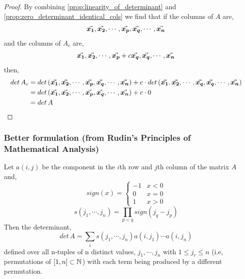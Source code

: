 \documentclass[MathsNotesBase.tex]{subfiles}
\begin{document}
{		
		\begin{proof}
			By combining \autoref{prop:linearity_of_determinant} and \autoref{prop:zero_determinant_identical_cols} we find that if the columns of $A$ are,
			\[ \vec{\bm{x_1}}, \vec{\bm{x_2}}, \cdots ,  \vec{\bm{x_p}}, \vec{\bm{x_q}}, \cdots, \vec{\bm{x_n}} \]
			and the columns of $A_c$ are,
			\[ \vec{\bm{x_1}}, \vec{\bm{x_2}}, \cdots , \vec{\bm{x_p}} + c\vec{\bm{x_q}}, \vec{\bm{x_q}}, \cdots , \vec{\bm{x_n}} \]
			then,
			\begin{align*} 
				det\,A_c &= det\,(\vec{\bm{x_1}}, \vec{\bm{x_2}}, \cdots ,  \vec{\bm{x_p}}, \vec{\bm{x_q}}, \cdots, \vec{\bm{x_n}}) + c \cdot det\,(\vec{\bm{x_1}}, \vec{\bm{x_2}}, \cdots ,  \vec{\bm{x_q}}, \vec{\bm{x_q}}, \cdots, \vec{\bm{x_n}})\\
						 &= det\,(\vec{\bm{x_1}}, \vec{\bm{x_2}}, \cdots ,  \vec{\bm{x_p}}, \vec{\bm{x_q}}, \cdots, \vec{\bm{x_n}}) + c \cdot 0\\
						 &= det\,A
			\end{align*}
		\end{proof}
	
		\subsubsection{Better formulation \tiny{(from Rudin's Principles of Mathematical Analysis)}}
		Let $a(i,j)$ be the component in the $i$th row and $j$th column of the matrix $A$ and, 
		\[ sign(x) = \begin{cases} 
						-1 & x < 0 \\
						0 & x = 0 \\
						1 & x > 0 
					 \end{cases} 
		\]
		\[ s(j_1,\cdots,j_n) = \prod_{p < q}{sign(j_q - j_p)} \]
		Then the determinant,
		\[ det\, A = \sum_{i}s(j_1,\cdots,j_n)a(i,j_1) \cdots a(i,j_n) \]
		defined over all n-tuples of n distinct values, $j_1, \cdots, j_n$ with ${1 \leq j_r \leq n}$ (i.e, permutations of $[1,n] \subset \mathbb{N}^{}$) with each term being produced by a different permutation. 
		\bigskip
		
}
\end{document}
